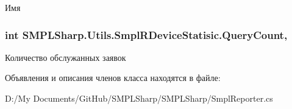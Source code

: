 Имя 

\hypertarget{class_s_m_p_l_sharp_1_1_utils_1_1_smpl_r_device_statisic_ac8c73d6bf105ba2983b1160b4b037cef}{
\subsubsection[{Query\-Count}]{\setlength{\rightskip}{0pt plus 5cm}int S\-M\-P\-L\-Sharp.\-Utils.\-Smpl\-R\-Device\-Statisic.\-Query\-Count\hspace{0.3cm}{\ttfamily [get]}, {\ttfamily [set]}}}\label{d7/d3b/class_s_m_p_l_sharp_1_1_utils_1_1_smpl_r_device_statisic_ac8c73d6bf105ba2983b1160b4b037cef}


Количество обслужанных заявок 



Объявления и описания членов класса находятся в файле\-:\begin{DoxyCompactItemize}
\item 
D\-:/\-My Documents/\-Git\-Hub/\-S\-M\-P\-L\-Sharp/\-S\-M\-P\-L\-Sharp/Smpl\-Reporter.\-cs\end{DoxyCompactItemize}
